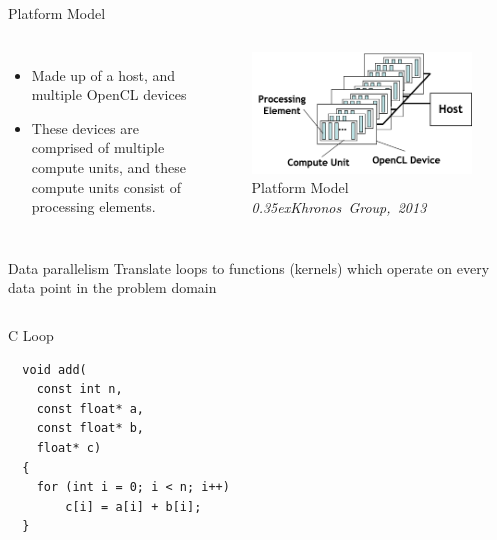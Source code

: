 \documentclass[10pt,aspectratio=169]{beamer} %
\begin{document}
\begin{frame}{Platform Model}

\begin{columns}[onlytextwidth]
\column{\dimexpr\linewidth-80mm-5mm}
\begin{itemize}
\item Made up of a host, and multiple OpenCL devices %
\item These devices are comprised of multiple compute units, and these compute units consist of processing elements.
\end{itemize}

\column{80mm}
\begin{figure}
    \includegraphics[width=\textwidth]{PlatformModel.png}
    \caption{Platform Model \emph{\textcopyright \scriptsize\raise0.35ex\hbox{Khronos Group, 2013}}}
\end{figure}
\end{columns}
  
\end{frame}

\begin{frame}[fragile,t]{Data parallelism}
\vspace{1em}
Translate loops to functions (kernels) which operate on every data point in the problem domain
\vspace{1em}
\begin{columns}[t]
\begin{column}{0.5\textwidth}
\alert{C Loop}
\begin{lstlisting}
  void add(
    const int n,
    const float* a,
    const float* b,
    float* c)
  {
    for (int i = 0; i < n; i++)
        c[i] = a[i] + b[i];
  }
\end{lstlisting}
\end{column}%
\hspace{-10pt}
\vrule{}%
\hspace{15pt}
\begin{column}{0.5\textwidth}
\end{column}
\end{columns}
\end{frame}
\end{document}
